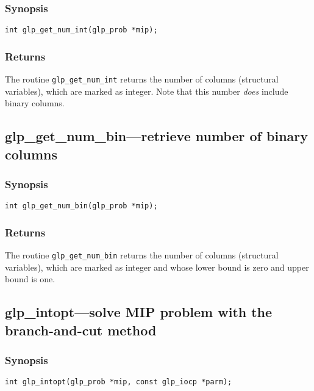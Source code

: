 \subsubsection*{Synopsis}

\begin{verbatim}
int glp_get_num_int(glp_prob *mip);
\end{verbatim}

\subsubsection*{Returns}

The routine \verb|glp_get_num_int| returns the number of columns
(structural variables), which are marked as integer. Note that this
number {\it does} include binary columns.

\subsection{glp\_get\_num\_bin---retrieve number of binary columns}

\subsubsection*{Synopsis}

\begin{verbatim}
int glp_get_num_bin(glp_prob *mip);
\end{verbatim}

\subsubsection*{Returns}

The routine \verb|glp_get_num_bin| returns the number of columns
(structural variables), which are marked as integer and whose lower
bound is zero and upper bound is one.

\subsection{glp\_intopt---solve MIP problem with the branch-and-cut
method}

\subsubsection*{Synopsis}

\begin{verbatim}
int glp_intopt(glp_prob *mip, const glp_iocp *parm);
\end{verbatim}

